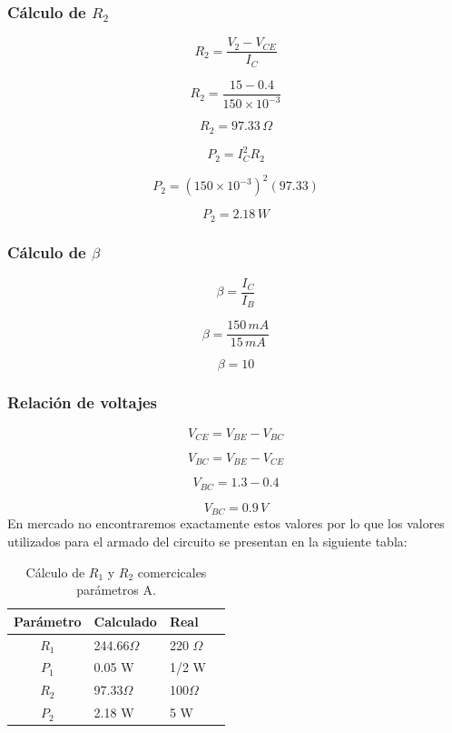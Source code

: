 \documentclass[journal]{IEEEtran}
\begin{document}
        \subsubsection{Cálculo de $R_2$}

        \[
        R_2 = \frac{V_2 - V_{CE}}{I_C}
        \]

        \[
        R_2 = \frac{15 - 0.4}{150 \times 10^{-3}}
        \]

        \[
        R_2 = 97.33\,\Omega
        \]

        \[
        P_2 = I_C^2 R_2
        \]

        \[
        P_2 = (150 \times 10^{-3})^2 (97.33)
        \]

        \[
        P_2 = 2.18\,W
        \]

        \subsubsection{Cálculo de $\beta$}

        \[
        \beta = \frac{I_C}{I_B}
        \]

        \[
        \beta = \frac{150\,mA}{15\,mA}
        \]

        \[
        \beta = 10
        \]

        \subsubsection{Relación de voltajes}

        \[
        V_{CE} = V_{BE} - V_{BC}
        \]

        \[
        V_{BC} = V_{BE} - V_{CE}
        \]

        \[
        V_{BC} = 1.3 - 0.4
        \]

        \[
        V_{BC} = 0.9\,V
        \]
        En mercado no encontraremos exactamente estos valores por lo que los valores utilizados para el armado del circuito se presentan en la siguiente tabla:
            \begin{table}[H]
                \centering
                \small 
                \begin{tabularx}{\columnwidth}{|c|X|X|X|}
                \hline
                \textbf{Parámetro} & \textbf{Calculado} & \textbf{Real} \\ \hline
                $R_1$  & 244.66$\Omega$ & 220 $\Omega$\\ \hline
                $P_1$  & 0.05 W & 1/2 W\\ \hline
                $R_2$  & 97.33$\Omega$ & 100$\Omega$\\ \hline
                $P_2$  & 2.18 W        & 5 W\\ \hline
                \end{tabularx}
                \caption{Cálculo de $R_1$ y $R_2$ comercicales parámetros A.}
                \label{tabla:erres.}
            \end{table}
\end{document}
